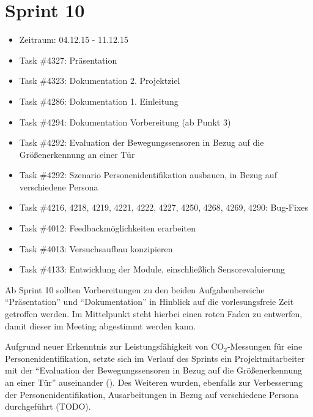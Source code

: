 \documentclass[12pt, oneside, smallheadings]{scrbook}
\begin{document}
\section{Sprint 10}
\begin{itemize}
	\item Zeitraum: 04.12.15 - 11.12.15 \newline
	\item Task \#4327: Präsentation
	\item Task \#4323: Dokumentation 2. Projektziel
	\item Task \#4286: Dokumentation 1. Einleitung
	\item Task \#4294: Dokumentation Vorbereitung (ab Punkt 3)
	\item Task \#4292: Evaluation der Bewegungssensoren in Bezug auf die Größenerkennung an einer Tür
	\item Task \#4292: Szenario Personenidentifikation ausbauen, in Bezug auf verschiedene Persona
	\item Task \#4216, 4218, 4219, 4221, 4222, 4227, 4250, 4268, 4269, 4290: Bug-Fixes
	\item Task \#4012: Feedbackmöglichkeiten erarbeiten
	\item Task \#4013: Versuchsaufbau konzipieren
	\item Task \#4133: Entwicklung der Module, einschließlich Sensorevaluierung\\
\end{itemize}
\noindent
Ab Sprint 10 sollten Vorbereitungen zu den beiden Aufgabenbereiche "`Präsentation"' und "`Dokumentation"' in Hinblick auf die vorlesungsfreie Zeit getroffen werden. Im Mittelpunkt steht hierbei einen roten Faden zu entwerfen, damit dieser im Meeting abgestimmt werden kann.

Aufgrund neuer Erkenntnis zur Leistungsfähigkeit von CO$_2$-Messungen für eine Personenidentifikation, setzte sich im Verlauf des Sprints ein Projektmitarbeiter mit der "`Evaluation der Bewegungssensoren in Bezug auf die Größenerkennung an einer Tür"' auseinander (). Des Weiteren wurden, ebenfalls zur Verbesserung der Personenidentifikation, Ausarbeitungen in Bezug auf verschiedene Persona durchgeführt (TODO).
\end{document}
